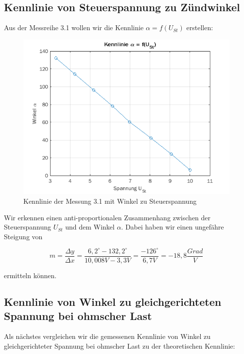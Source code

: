 \documentclass{article}
\begin{document}
\subsection{Kennlinie von Steuerspannung zu Zündwinkel}
\label{sec:kennl-von-steu}

Aus der Messreihe 3.1 wollen wir die Kennlinie $\alpha = f(U_{St})$ erstellen:

\begin{figure}[h]
  \centering
  \includegraphics[width=\textwidth]{../assets/images/GEP2/alpha_ust.png}
  \caption{Kennlinie der Messung 3.1 mit Winkel zu Steuerspannung}
  \label{fig:alphaust}
\end{figure}

Wir erkennen einen anti-proportionalen Zusammenhang zwischen der Steuerspannung $U_{St}$ und dem Winkel $\alpha$. Dabei haben wir einen ungefähre Steigung von

\begin{equation*}
  m = \frac{\Delta y}{\Delta x} = \frac{6,2^{\circ} - 132,2^{\circ}}{10,008V - 3,3V} = \frac{-126^{\circ}}{6,7V} = -18,8 \frac{Grad}{V}
\end{equation*}

ermitteln können.

\subsection{Kennlinie von Winkel zu gleichgerichteten Spannung bei ohmscher Last}
\label{sec:kennlinie-von-winkel}

Als nächstes vergleichen wir die gemessenen Kennlinie von Winkel zu gleichgerichteter Spannung bei ohmscher Last zu der theoretischen Kennlinie:
\end{document}
